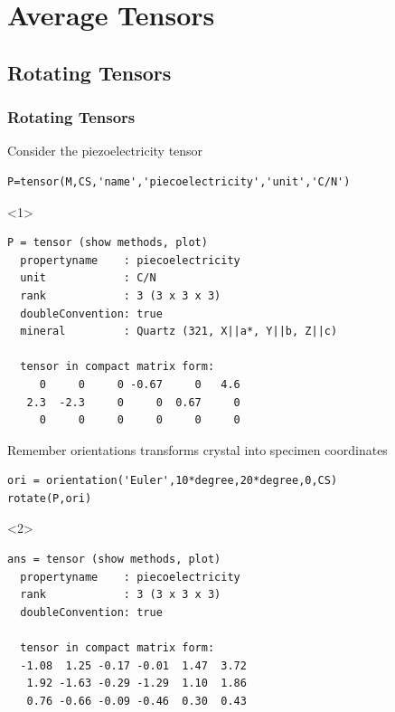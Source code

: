 \documentclass[compress]{beamer}
\begin{document}
\section{Average Tensors}
\label{sec:average-tensors}

\subsection*{Rotating Tensors}

\begin{frame}[fragile]
  \frametitle{Rotating Tensors}

  \begin{overlayarea}{\textwidth}{\textheight}
      Consider the piezoelectricity tensor
  \vspace{-0.2cm}
        \begin{lstlisting}[style=input]
P=tensor(M,CS,'name','piecoelectricity','unit','C/N')
\end{lstlisting}
\begin{onlyenv}<1>
          \begin{lstlisting}[style=output]
P = tensor (show methods, plot)
  propertyname    : piecoelectricity
  unit            : C/N
  rank            : 3 (3 x 3 x 3)
  doubleConvention: true
  mineral         : Quartz (321, X||a*, Y||b, Z||c)

  tensor in compact matrix form:
     0     0     0 -0.67     0   4.6
   2.3  -2.3     0     0  0.67     0
     0     0     0     0     0     0
        \end{lstlisting}
      \end{onlyenv}

      \pause
      \medskip
      Remember orientations transforms crystal into specimen coordinates
      \vspace{-0.2cm}
  \begin{lstlisting}[style=input]
ori = orientation('Euler',10*degree,20*degree,0,CS)
rotate(P,ori)
  \end{lstlisting}
\begin{onlyenv}<2>
  \vspace{-.3cm}
\begin{lstlisting}[style=output]
ans = tensor (show methods, plot)
  propertyname    : piecoelectricity
  rank            : 3 (3 x 3 x 3)
  doubleConvention: true

  tensor in compact matrix form:
  -1.08  1.25 -0.17 -0.01  1.47  3.72
   1.92 -1.63 -0.29 -1.29  1.10  1.86
   0.76 -0.66 -0.09 -0.46  0.30  0.43
\end{lstlisting}
\end{onlyenv}


\end{overlayarea}
\end{frame}
\end{document}

